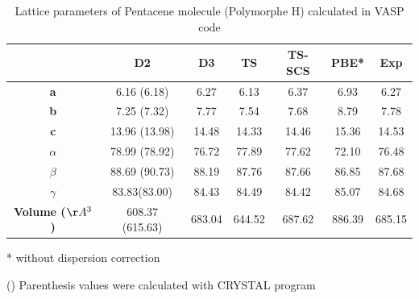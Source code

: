  	\begin{table}[htb]
 		\caption{Lattice parameters of Pentacene molecule (Polymorphe H) calculated in VASP code} \label{table-penta}
 		\begin{center}
 			\begin{threeparttable}
 			\begin{tabular}{c c c c c c c}
 				\toprule
 				& \textbf{D2} & \textbf{D3} & \textbf{TS} & \textbf{TS-SCS} & \textbf{PBE*} & \textbf{Exp} \\
 				\midrule
 				\textbf{a} &6.16 (6.18) & 6.27 & 6.13 & 6.37 & 6.93 & 6.27\\
 				\textbf{b}& 7.25 (7.32) & 7.77 & 7.54 & 7.68 & 8.79 & 7.78 \\
 				\textbf{c}& 13.96 (13.98) & 14.48 & 14.33 & 14.46 & 15.36 & 14.53 \\
 				\textbf{$\alpha$} & 78.99 (78.92) & 76.72 & 77.89 & 77.62 & 72.10 &76.48\\
 				\textbf{$\beta$} & 88.69 (90.73) & 88.19 & 87.76 & 87.66 & 86.85 & 87.68\\
 				\textbf{$\gamma$} & 83.83(83.00) & 84.43 & 84.49 & 84.42 & 85.07 & 84.68\\
 				\textbf{Volume ($\AA^{3}$)} & 608.37 (615.63) & 683.04 & 644.52 & 687.62  & 886.39 & 685.15\\
 				\bottomrule
 			\end{tabular}
 			
 			\begin{tablenotes}
 				\item[*] without dispersion correction
 				\item[()] Parenthesis values were calculated with CRYSTAL program
 			\end{tablenotes}
 		\end{threeparttable}
 		\end{center}
 	\end{table}
 	
